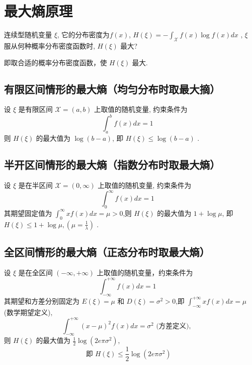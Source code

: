 \section{最大熵原理}
连续型随机变量 $ \xi$, 它的分布密度为$f(x)$, $ H(\xi)=-\displaystyle\int_{\mathscr{X}} f(x) \log f(x) d x $ , $ \xi $ 服从何种概率分布密度函数时, $ H(\xi) $ 最大?

即取合适的概率分布密度函数，使 $ H(\xi) $ 最大.

\subsection{有限区间情形的最大熵（均匀分布时取最大摘）}
设 $ \xi $ 是有限区间 $ \mathscr{X}=(a, b) $ 上取值的随机变量, 约束条件为
$$
\int_{a}^{b} f(x) d x=1
$$
则 $ H(\xi) $ 的最大值为 $ \log (b-a) $, 即 $ H(\xi) \leqslant \log (b-a) $ .

\subsection{半开区间情形的最大熵（指数分布时取最大熵）}

设 $ \xi $ 是在半区间 $ \mathscr{X}=(0, \infty) $ 上取值的随机变量, 约束条件为
$$
\int_{0}^{\infty} f(x) d x=1
$$
其期望固定值为 $ \displaystyle\int_{0}^{\infty} x f(x) d x=\mu>0 $,则 $ H(\xi) $ 的最大值为 $ 1+\log \mu $, 即 $ H(\xi) \leqslant 1+\log \mu,\left(\mu=\frac{1}{\lambda}\right) $ .


\subsection{全区间情形的最大熵（正态分布时取最大熵）}
设 $ \xi $ 是在全区间 $ (-\infty,+\infty) $ 上取值的随机变量，约束条件为
$$
\int_{-\infty}^{+\infty} f(x) d x=1
$$
其期望和方差分别固定为 $ E(\xi)=\mu $ 和 $ D(\xi)=\sigma^{2}>0 $,即 $ \displaystyle\int_{-\infty}^{+\infty} x f(x) d x=\mu $ (数学期望定义),
$$
\int_{-\infty}^{+\infty}(x-\mu)^{2} f(x) d x=\sigma^{2} \text { (方差定义), }
$$
则 $ H(\xi) $ 的最大值为 $ \frac{1}{2} \log \left(2 e \pi \sigma^{2}\right) $,
$$
\text { 即 } H(\xi) \leqslant \frac{1}{2} \log \left(2 e \pi \sigma^{2}\right)
$$